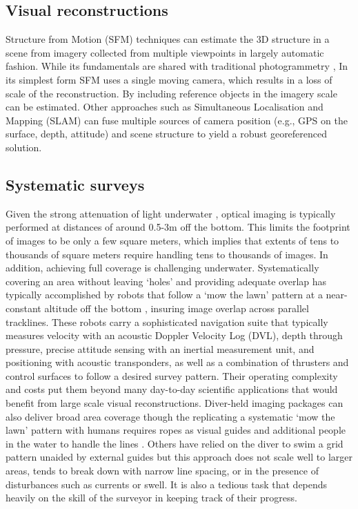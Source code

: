 \subsection{Visual reconstructions}
Structure from Motion (SFM) techniques \cite{Hartley_2004} can estimate the 3D structure in a scene from imagery collected from multiple viewpoints in largely automatic fashion. While its fundamentals are shared with traditional photogrammetry \cite{Jones_1982},   In its simplest form SFM uses a single moving camera, which results in a loss of scale of the reconstruction. By including reference objects in the imagery scale can be estimated.
Other approaches such as Simultaneous Localisation and Mapping (SLAM) \cite{Thrun_2008} can fuse multiple sources of camera position (e.g., GPS on the surface, depth, attitude) and scene structure to yield a robust georeferenced solution.

\subsection{Systematic surveys}
Given the strong attenuation of light underwater \cite{DUNTLEY_1963}, optical imaging is typically performed at distances of around 0.5-3m off the bottom. This limits the footprint of images to be only a few square meters, which implies that extents of tens to thousands of square meters require handling tens to thousands of images. In addition, achieving full coverage is challenging underwater. Systematically covering an area without leaving `holes' and providing adequate overlap has typically accomplished by robots that follow a `mow the lawn' pattern at a near-constant altitude off the bottom \cite{Bingham_2010}\cite{Williams_2010}, insuring image overlap across parallel tracklines. These robots carry a sophisticated navigation suite that typically measures velocity with an acoustic Doppler Velocity Log (DVL), depth through pressure, precise attitude sensing with an inertial measurement unit, and positioning with acoustic transponders, as well as a combination of thrusters and control surfaces to follow a desired survey pattern. Their operating complexity and costs put them beyond many day-to-day scientific applications that would benefit from large scale visual reconstructions.
Diver-held imaging packages can also deliver broad area coverage though the replicating a systematic `mow the lawn' pattern with humans requires ropes as visual guides and additional people in the water to handle the lines \cite{Henderson_2013}. Others \cite{Burns_2015} have relied on the diver to swim a grid pattern unaided by external guides but this approach does not scale well to larger areas, tends to break down with narrow line spacing, or in the presence of disturbances such as currents or swell. It is also a tedious task that depends heavily on the skill of the surveyor in keeping track of their progress.

